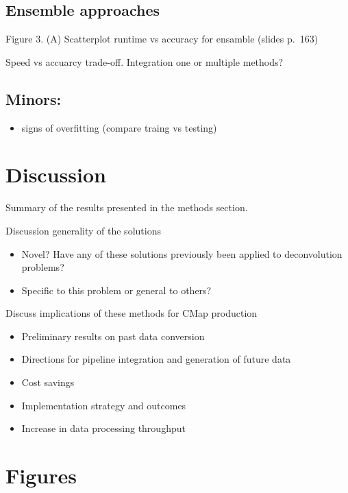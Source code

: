 \documentclass[]{article}
\providecommand{\tightlist}{%
  \setlength{\itemsep}{0pt}\setlength{\parskip}{0pt}}
\begin{document}
\hypertarget{ensemble-approaches}{%
\subsection{Ensemble approaches}\label{ensemble-approaches}}

Figure 3. (A) Scatterplot runtime vs accuracy for ensamble (slides
p.~163)

Speed vs accuarcy trade-off. Integration one or multiple methods?

\hypertarget{minors}{%
\subsection{Minors:}\label{minors}}

\begin{itemize}
\tightlist
\item
  signs of overfitting (compare traing vs testing)
\end{itemize}

\hypertarget{discussion}{%
\section{Discussion}\label{discussion}}

Summary of the results presented in the methods section.

Discussion generality of the solutions

\begin{itemize}
\tightlist
\item
  Novel? Have any of these solutions previously been applied to
  deconvolution problems?
\item
  Specific to this problem or general to others?
\end{itemize}

Discuss implications of these methods for CMap production

\begin{itemize}
\tightlist
\item
  Preliminary results on past data conversion
\item
  Directions for pipeline integration and generation of future data
\item
  Cost savings
\item
  Implementation strategy and outcomes
\item
  Increase in data processing throughput
\end{itemize}

\hypertarget{figures}{%
\section{Figures}\label{figures}}
\end{document}

